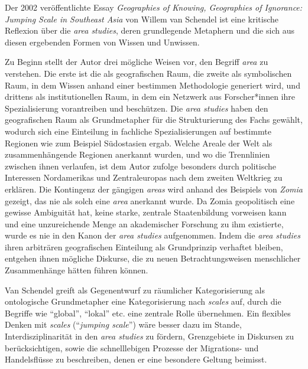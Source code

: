 \documentclass[a4paper, 12pt]{article}
\begin{document}
\begin{onehalfspace} 


\noindent Der 2002 veröffentlichte Essay \emph{Geographies of Knowing, Geographies of Ignorance: Jumping Scale in Southeast Asia} von Willem van Schendel ist eine kritische Reflexion über die \emph{area studies}, deren grundlegende Metaphern und die sich aus diesen ergebenden Formen von Wissen und Unwissen.

Zu Beginn stellt der Autor drei mögliche Weisen vor, den Begriff \emph{area} zu verstehen. Die erste ist die als geografischen Raum, die zweite als symbolischen Raum, in dem Wissen anhand einer bestimmen Methodologie generiert wird, und drittens als institutionellen Raum, in dem ein Netzwerk aus Forscher*innen ihre Spezialisierung vorantreiben und beschützen. Die \emph{area studies} haben den geografischen Raum als Grundmetapher für die Strukturierung des Fachs gewählt, wodurch sich eine Einteilung in fachliche Spezialisierungen auf bestimmte Regionen wie zum Beispiel Südostasien ergab. Welche Areale der Welt als zusammenhängende Regionen anerkannt wurden, und wo die Trennlinien zwischen ihnen verlaufen, ist dem Autor zufolge besonders durch politische Interessen Nordamerikas und Zentraleuropas nach dem zweiten Weltkrieg zu erklären. Die Kontingenz der gängigen \emph{areas} wird anhand des Beispiels von \emph{Zomia} gezeigt, das nie als solch eine \emph{area} anerkannt wurde. Da Zomia geopolitisch eine gewisse Ambiguität hat, keine starke, zentrale Staatenbildung vorweisen kann und eine unzureichende Menge an akademischer Forschung zu ihm existierte, wurde es nie in den Kanon der \emph{area studies} aufgenommen. Indem die \emph{area studies} ihren arbiträren geografischen Einteilung als Grundprinzip verhaftet bleiben, entgehen ihnen mögliche Diskurse, die zu neuen Betrachtungsweisen menschlicher Zusammenhänge hätten führen können.

Van Schendel greift als Gegenentwurf zu räumlicher Kategorisierung als ontologische Grundmetapher eine Kategorisierung nach \emph{scales} auf, durch die Begriffe wie "`global"', "`lokal"' etc. eine zentrale Rolle übernehmen. Ein flexibles Denken mit \emph{scales} ("`\emph{jumping scale}"') wäre besser dazu im Stande, Interdisziplinarität in den \emph{area studies} zu fördern, Grenzgebiete in Diskursen zu berücksichtigen, sowie die schnelllebigen Prozesse der Migrations- und Handelsflüsse zu beschreiben, denen er eine besondere Geltung beimisst.



\end{onehalfspace}
\nocite{*}
%
\printbibliography
\end{document}
